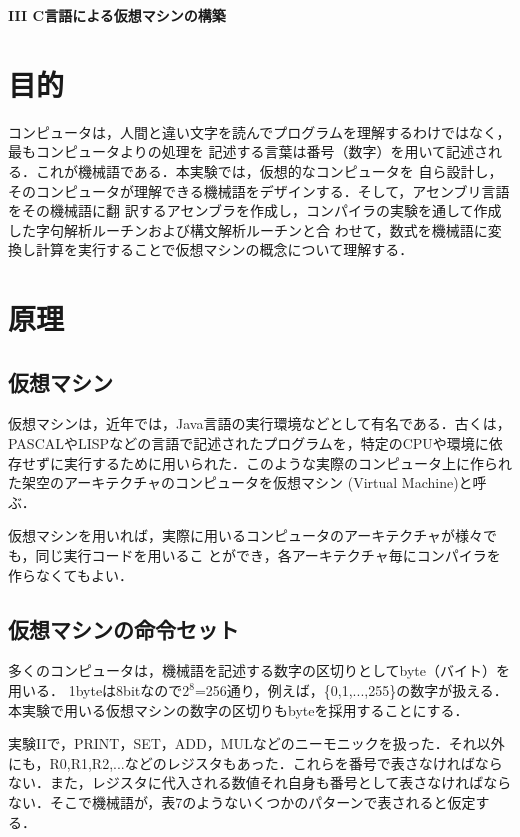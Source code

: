 \documentclass[a4j]{jsarticle}  %
\begin{document}
\newpage
\begin{center}
 {\Large \bf III C言語による仮想マシンの構築}
\end{center}

\section{目的}
コンピュータは，人間と違い文字を読んでプログラムを理解するわけではなく，最もコンピュータよりの処理を
記述する言葉は番号（数字）を用いて記述される．これが機械語である．本実験では，仮想的なコンピュータを
自ら設計し，そのコンピュータが理解できる機械語をデザインする．そして，アセンブリ言語をその機械語に翻
訳するアセンブラを作成し，コンパイラの実験を通して作成した字句解析ルーチンおよび構文解析ルーチンと合
わせて，数式を機械語に変換し計算を実行することで仮想マシンの概念について理解する．


\section{原理}
\subsection{仮想マシン}
仮想マシンは，近年では，Java言語の実行環境などとして有名である．古くは，
PASCALやLISPなどの言語で記述されたプログラムを，特定のCPUや環境に依存せずに実行するために用いられた．このような実際のコンピュータ上に作られた架空のアーキテクチャのコンピュータを仮想マシン
(Virtual Machine)と呼ぶ．

仮想マシンを用いれば，実際に用いるコンピュータのアーキテクチャが様々でも，同じ実行コードを用いるこ
とができ，各アーキテクチャ毎にコンパイラを作らなくてもよい．

\subsection{仮想マシンの命令セット}
多くのコンピュータは，機械語を記述する数字の区切りとしてbyte（バイト）を用いる．
1byteは8bitなので$2^8$=256通り，例えば，\{0,1,...,255\}の数字が扱える．本実験で用いる仮想マシンの数字の区切りもbyteを採用することにする．

実験IIで，PRINT，SET，ADD，MULなどのニーモニックを扱った．それ以外にも，R0,R1,R2,...などのレジスタもあった．これらを番号で表さなければならない．また，レジスタに代入される数値それ自身も番号として表さなければならない．そこで機械語が，表7のようないくつかのパターンで表されると仮定する．
\end{document}
